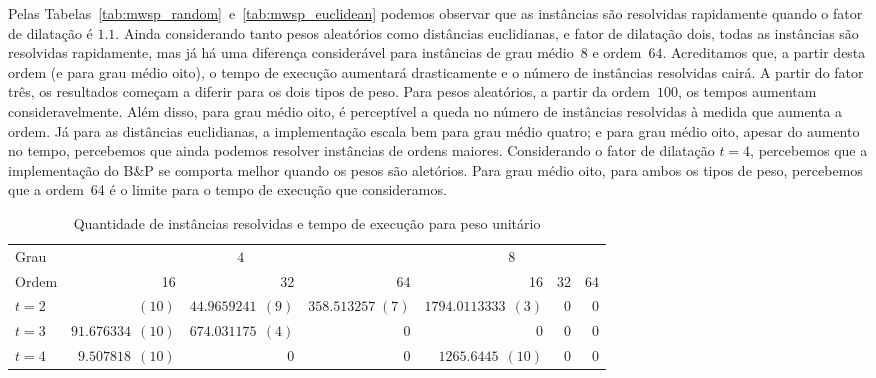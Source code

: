 Pelas Tabelas~\ref{tab:mwsp_random}~e~\ref{tab:mwsp_euclidean} podemos
observar que as instâncias são resolvidas rapidamente quando o fator de
dilatação é $\num{1,1}$.  Ainda considerando tanto pesos aleatórios
como distâncias
euclidianas, e fator de dilatação dois, todas as instâncias são
resolvidas rapidamente, mas já há uma diferença considerável para
instâncias de grau médio~8 e ordem~$64$.  Acreditamos que, a partir desta ordem
(e para grau médio oito), o
tempo de execução aumentará drasticamente e o número de instâncias
resolvidas cairá. A partir do fator três, os resultados começam a
diferir para os dois tipos de peso. Para pesos aleatórios, a partir da
ordem~$100$, os tempos aumentam consideravelmente.  Além disso, para
grau médio oito, é perceptível a queda no número de instâncias resolvidas à
medida que aumenta a ordem. Já para as distâncias euclidianas, a implementação
escala bem para grau médio quatro; e para grau médio oito, apesar do aumento no
tempo, percebemos que ainda podemos resolver instâncias de ordens
maiores. Considerando o fator de dilatação $t = 4$, 
percebemos que a implementação do B\&P se comporta melhor quando os pesos são
aletórios.  Para grau médio oito, para ambos os tipos de peso,
percebemos que a ordem~64 é o limite para
o tempo de execução que consideramos. 

\begin{table}
\centering
\begin{tabular}{|l|rrr|rrr|}\hline
Grau & \multicolumn{3}{c|}{$4$} & \multicolumn{3}{c|}{$8$} \\
Ordem & 16 & 32 & 64 & 16 & 32 & 64 \\
\hline
\hline
$t = 2$ & $(10)$ & $\num{44,9659241} \;\,(9)$ & $\num{358,513257} \;(7)$ & $\num{1794,0113333} \;\,(3)$ & $0$ & $0$ \\
$t = 3$ & $\num{91,676334} \;\,(10)$ & $\num{674,031175}\;\,(4)$ & $0$ & $0$ & $0$ & $0$ \\
$t = 4$ & $\num{9,507818}\;\,(10)$ & $0$ & $0$ & $\num{1265,6445} \;\,(10)$ & $0$ & $0$ \\
\hline
\end{tabular}
\caption{Quantidade de instâncias resolvidas e tempo de execução para peso unitário}\label{tab:mwsp_unit}
\end{table}


